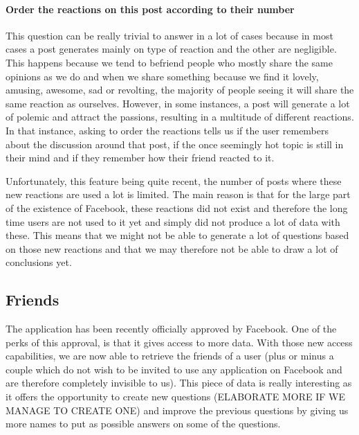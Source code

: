 \paragraph{Order the reactions on this post according to their number}
This question can be really trivial to answer in a lot of cases because in most cases a post generates mainly on type of reaction and the other are negligible. This happens because we tend to befriend people who mostly share the same opinions as we do and when we share something because we find it lovely, amusing, awesome, sad or revolting, the majority of people seeing it will share the same reaction as ourselves. However, in some instances, a post will generate a lot of polemic and attract the passions, resulting in a multitude of different reactions. In that instance, asking to order the reactions tells us if the user remembers about the discussion around that post, if the once seemingly hot topic is still in their mind and if they remember how their friend reacted to it.

Unfortunately, this feature being quite recent, the number of posts where these new reactions are used a lot is limited. The main reason is that for the large part of the existence of Facebook, these reactions did not exist and therefore the long time users are not used to it yet and simply did not produce a lot of data with these. This means that we might not be able to generate a lot of questions based on those new reactions and that we may therefore not be able to draw a lot of conclusions yet.
\subsection{Friends}
The application has been recently officially approved by Facebook. One of the perks of this approval, is that it gives access to more data. With those new access capabilities, we are now able to retrieve the friends of a user (plus or minus a couple which do not wish to be invited to use any application on Facebook and are therefore completely invisible to us). This piece of data is really interesting as it offers the opportunity to create new questions (ELABORATE MORE IF WE MANAGE TO CREATE ONE) and improve the previous questions by giving us more names to put as possible answers on some of the questions.